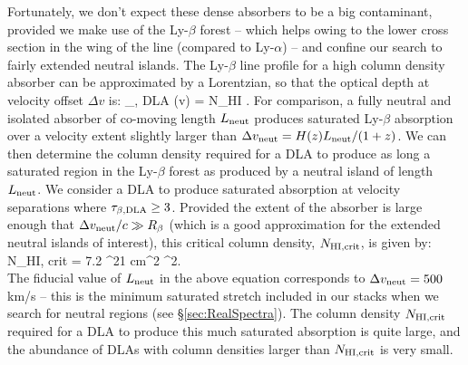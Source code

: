 Fortunately, we don't expect these dense absorbers to be a big contaminant,
provided we make use of the Ly-$\beta$ forest -- which helps owing to
the lower cross section in the wing of the 
line (compared to Ly-$\alpha$) -- and confine our
search to fairly extended neutral islands. The Ly-$\beta$ line profile
for a high column density absorber can be approximated
by a Lorentzian, so that the optical depth at velocity offset $\Delta v$ is:
\beqa
\tau_{\beta, \rm{DLA}} (\Delta v) = N_{\rm HI}  .
\label{eq:taub_dla}
\eeqa
For comparison, a fully neutral and isolated absorber of co-moving length $L_{\rm neut}$ produces saturated Ly-$\beta$ absorption over a
velocity extent slightly larger than $\Delta v_{\rm neut} = H(z) L_{\rm neut}/(1+z)$. We can then
determine the column density required for a DLA to produce as long a saturated region in the Ly-$\beta$ forest as produced
by  a neutral island of
length $L_{\rm neut}$. We consider a DLA to produce saturated absorption at velocity separations where $\tau_{\beta, \rm{DLA}} \geq 3$.
Provided the extent of the absorber is large enough that $\Delta v_{\rm neut}/c \gg R_\beta$ (which
is a good approximation for the extended neutral islands of interest), this 
critical column density, $N_{\rm HI, crit}$, is given by:
\beqa
N_{\rm HI, crit} = 7.2 ^{21} \rm{cm}^2  
^2. \nonumber \\
\label{eq:ncrit}
\eeqa
The fiducial value of $L_{\rm neut}$ in the above equation corresponds to $\Delta v_{\rm neut} = 500$ km/s -- this is
the minimum saturated stretch included in our stacks when we search for neutral regions (see \S \ref{sec:RealSpectra}). The 
column density $N_{\rm HI, crit}$ required for a DLA to produce this much saturated absorption is quite large, and
the abundance of DLAs with column densities larger than $N_{\rm HI, crit}$ is very small. 

